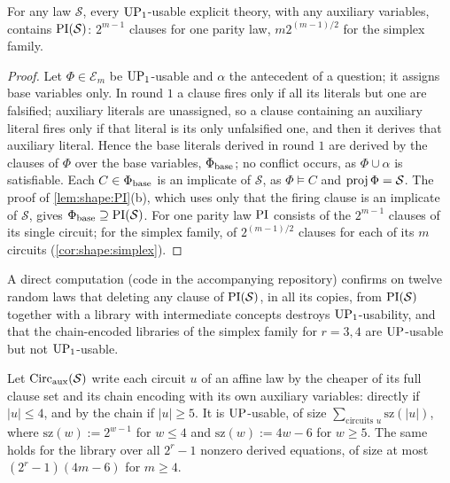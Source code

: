 \begin{proposition}\label{prop:shape:oneround}
For any law $\mathcal S$, every $\mathrm{UP}_1$-usable explicit theory, with any auxiliary variables, contains $\mathrm{PI}(\mathcal S)$: $2^{m-1}$ clauses for one parity law, $m2^{(m-1)/2}$ for the simplex family.
\end{proposition}

\begin{proof}
Let $\Phi\in\mathcal E_m$ be $\mathrm{UP}_1$-usable and $\alpha$ the antecedent of a question; it assigns base variables only. In round $1$ a clause fires only if all its literals but one are falsified; auxiliary literals are unassigned, so a clause containing an auxiliary literal fires only if that literal is its only unfalsified one, and then it derives that auxiliary literal. Hence the base literals derived in round $1$ are derived by the clauses of $\Phi$ over the base variables, $\Phi_{\rm base}$; no conflict occurs, as $\Phi\cup\alpha$ is satisfiable. Each $C\in\Phi_{\rm base}$ is an implicate of $\mathcal S$, as $\Phi\models C$ and $\operatorname{proj}\Phi=\mathcal S$. The proof of \cref{lem:shape:PI}(b), which uses only that the firing clause is an implicate of $\mathcal S$, gives $\Phi_{\rm base}\supseteq\mathrm{PI}(\mathcal S)$. For one parity law $\mathrm{PI}$ consists of the $2^{m-1}$ clauses of its single circuit; for the simplex family, of $2^{(m-1)/2}$ clauses for each of its $m$ circuits (\cref{cor:shape:simplex}).
\end{proof}

A direct computation (code in the accompanying repository) confirms on twelve random laws that deleting any clause of $\mathrm{PI}(\mathcal S)$, in all its copies, from $\mathrm{PI}(\mathcal S)$ together with a library with intermediate concepts destroys $\mathrm{UP}_1$-usability, and that the chain-encoded libraries of the simplex family for $r=3,4$ are $\mathrm{UP}$-usable but not $\mathrm{UP}_1$-usable.

\begin{proposition}\label{prop:shape:library}
Let $\mathrm{Circ}_{\rm aux}(\mathcal S)$ write each circuit $u$ of an affine law by the cheaper of its full clause set and its chain encoding with its own auxiliary variables: directly if $\lvert u\rvert\le4$, and by the chain if $\lvert u\rvert\ge5$. It is $\mathrm{UP}$-usable, of size $\sum_{\text{circuits }u}\mathrm{sz}(\lvert u\rvert)$, where $\mathrm{sz}(w):=2^{w-1}$ for $w\le4$ and $\mathrm{sz}(w):=4w-6$ for $w\ge5$. The same holds for the library over all $2^r-1$ nonzero derived equations, of size at most $(2^r-1)(4m-6)$ for $m\ge4$.
\end{proposition}

